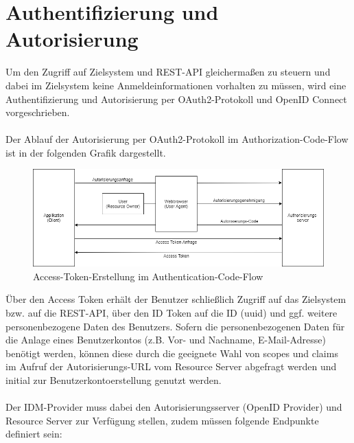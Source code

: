 \chapter{Authentifizierung und Autorisierung}
Um den Zugriff auf Zielsystem und REST-API gleichermaßen zu steuern und dabei im Zielsystem keine Anmeldeinformationen vorhalten zu müssen, wird eine Authentifizierung und Autorisierung per OAuth2-Protokoll und OpenID Connect vorgeschrieben.\\
\\
Der Ablauf der Autorisierung per OAuth2-Protokoll im Authorization-Code-Flow ist in der folgenden Grafik dargestellt. 

\begin{figure}[htbp]
\centering
\includegraphics[width=\textwidth]{Authentication_Flow.png}
\caption{Access-Token-Erstellung im Authentication-Code-Flow}
\end{figure}

Über den Access Token erhält der Benutzer schließlich Zugriff auf das Zielsystem bzw. auf die REST-API, über den ID Token auf die ID (uuid) und ggf. weitere personenbezogene Daten des Benutzers. 
Sofern die personenbezogenen Daten für die Anlage eines Benutzerkontos (z.B. Vor- und Nachname, E-Mail-Adresse) benötigt werden, können diese durch die geeignete Wahl von scopes und claims im Aufruf der Autorisierungs-URL vom Resource Server abgefragt werden und initial zur Benutzerkontoerstellung genutzt werden.\\
\\
Der IDM-Provider muss dabei den Autorisierungsserver (OpenID Provider) und Resource Server zur Verfügung stellen, zudem müssen folgende Endpunkte definiert sein:\\

